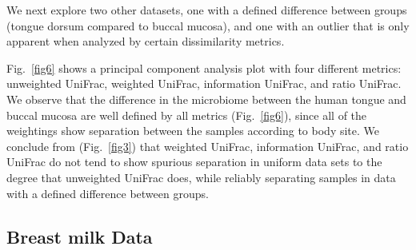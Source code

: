\documentclass[10pt,letterpaper]{article}
\begin{document}
We next explore two other datasets, one with a defined difference between groups (tongue dorsum compared to buccal mucosa), and one with an outlier that is only apparent when analyzed by certain dissimilarity metrics.

Fig.~\ref{fig6} shows a principal component analysis plot with four different metrics: unweighted UniFrac, weighted UniFrac, information UniFrac, and ratio UniFrac. We observe that the difference in the microbiome between the human tongue and buccal mucosa are well defined by all metrics (Fig.~\ref{fig6}), since all of the weightings show separation between the samples according to body site. We conclude from (Fig.~\ref{fig3}) that weighted UniFrac, information UniFrac, and ratio UniFrac do not tend to show spurious separation in uniform data sets to the degree that unweighted UniFrac does, while reliably separating samples in data with a defined difference between groups.

\FloatBarrier

\subsection{Breast milk Data}
\end{document}
